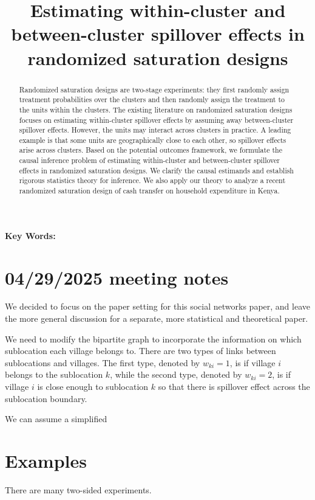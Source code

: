 \documentclass{article}
\title{Estimating within-cluster and between-cluster spillover effects in randomized saturation designs}
\date{}
\begin{document}
\maketitle
\begin{abstract}
    Randomized saturation designs are two-stage experiments: they first randomly assign treatment probabilities over the clusters and then randomly assign the treatment to the units within the clusters. The existing literature on randomized saturation designs focuses on estimating within-cluster spillover effects by assuming away between-cluster spillover effects. However, the units may interact across clusters in practice. A leading example is that some units are geographically close to each other, so spillover effects arise across clusters. Based on the potential outcomes framework, we formulate the causal inference problem of estimating within-cluster and between-cluster spillover effects in randomized saturation designs. We clarify the causal estimands and establish rigorous statistics theory for inference. We also apply our theory to analyze a recent randomized saturation design of cash transfer on household expenditure in Kenya.
\end{abstract}
{\small\hspace{2em} \textbf{Key Words: } }


\section{04/29/2025 meeting notes}
We decided to focus on the \cite{egger2022general} paper setting for this social networks paper, and leave the more general discussion for a separate, more statistical and theoretical paper.

We need to modify the bipartite graph to incorporate the information on which sublocation each village belongs to.  There are two types of links between sublocations and villages. The first type, denoted by $w_{ki}=1$, is if village $i$ belongs to the sublocation $k$, while the second type, denoted by $w_{ki} = 2$, is if village $i$ is close enough to sublocation $k$ so that there is spillover effect across the sublocation boundary.

We can assume a simplified 

\section{Examples}
\label{sec::examples}
There are many two-sided experiments. 
\end{document}
